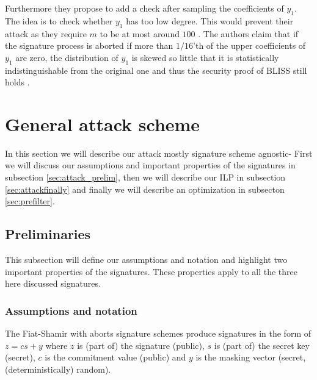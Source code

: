 Furthermore they propose to add a check after sampling the coefficients of $y_1$. The idea is to check whether $y_1$ has too low degree. This would prevent their attack as they require $m$ to be at most around $100$ \cite[p.~151]{espitau}. The authors claim that if the signature process is aborted if more than $1/16$'th of the upper coefficients of $y_1$ are zero, the distribution of $y_1$ is skewed so little that it is statistically indistinguishable from the original one and thus the security proof of BLISS still holds \cite[p.~155]{espitau}. 






\section{General attack scheme}
\label{sec:general}
In this section we will describe our attack mostly signature scheme agnostic- First we will discuss our assumptions and important properties of the signatures in subsection \ref{sec:attack_prelim}, then we will describe our ILP in subsection \ref{sec:attackfinally} and finally we will describe an optimization in subsecton \ref{sec:prefilter}.


\subsection{Preliminaries}
This subsection will define our assumptions and notation and highlight two important properties of the signatures. These properties apply to all the three here discussed signatures.

\label{sec:attack_prelim}
\subsubsection{Assumptions and notation}
\label{sec:attackmodelgeneral}
The Fiat-Shamir with aborts signature schemes produce signatures in the form of $z = cs + y$ where $z$ is (part of) the signature (public), $s$ is (part of) the secret key (secret), $c$ is the commitment value (public) and $y$ is the masking vector (secret, (deterministically) random).

